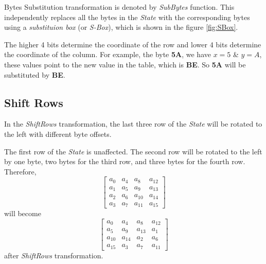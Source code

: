 \documentclass[a4paper, 10pt]{article}
\begin{document}
\begin{multicols}{2}
            Bytes Substitution transformation is denoted by \textit{SubBytes} function. This independently replaces all the bytes in the \textit{State} with the corresponding bytes using a \textit{substituion box} (or \textit{S-Box}), which is shown in the figure \ref{fig:SBox}.

            The higher 4 bits determine the coordinate of the row and lower 4 bits determine the coordinate of the column. For example, the byte \textbf{5A}, we have $x=5$ \& $y=A$, these values point to the new value in the table, which is \textbf{BE}. So \textbf{5A} will be substituted by \textbf{BE}.

            \subsection{Shift Rows}
            \label{sec:shift-rows-intro}

            In the \textit{ShiftRows} transformation, the last three row of the \textit{State} will be rotated to the left with different byte offsets.

            The first row of the \textit{State} is unaffected. The second row will be rotated to the left by one byte, two bytes for the third row, and three bytes for the fourth row. Therefore,
            \begin{equation}
                \begin{bmatrix}
                    a_{0} & a_{4} & a_{8} & a_{12}\\
                    a_{1} & a_{5} & a_{9} & a_{13}\\
                    a_{2} & a_{6} & a_{10} & a_{14}\\
                    a_{3} & a_{7} & a_{11} & a_{15}
                \end{bmatrix}
            \end{equation}
            will become
            \begin{equation}
                \begin{bmatrix}
                    a_{0} & a_{4} & a_{8} & a_{12}\\
                    a_{5} & a_{9} & a_{13} & a_{1}\\
                    a_{10} & a_{14} & a_{2} & a_{6}\\
                    a_{15} & a_{3} & a_{7} & a_{11}
                \end{bmatrix}
            \end{equation}
            after \textit{ShiftRows} transformation.


\end{multicols}
\end{document}
